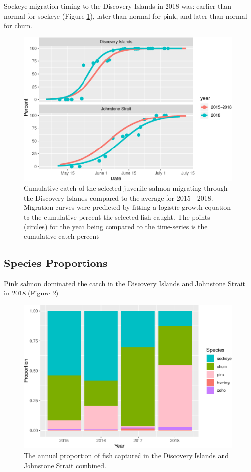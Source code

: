 \documentclass[fleqn,10pt]{wlpeerj} %
\begin{document}
Sockeye migration timing to the Discovery Islands in 2018 was: earlier
than normal for sockeye (Figure \ref{fig:mt}), later than normal for
pink, and later than normal for chum.

\begin{figure}
\includegraphics[width=0.8\linewidth]{peer_j_migration_dynamics_files/figure-latex/mt-1} \caption{Cumulative catch of the selected juvenile salmon migrating through the Discovery Islands compared to the average for 2015—2018. Migration curves were predicted by fitting a logistic growth equation to the cumulative percent the selected fish caught. The points (circles) for the year being compared to the time-series is the cumulative catch percent}\label{fig:mt}
\end{figure}

\subsection*{Species Proportions}\label{species-proportions}

Pink salmon dominated the catch in the Discovery Islands and Johnstone
Strait in 2018 (Figure \ref{fig:prop}).

\begin{figure}
\includegraphics[width=0.8\linewidth]{peer_j_migration_dynamics_files/figure-latex/prop-1} \caption{The annual proportion of fish captured in the Discovery Islands and Johnstone Strait combined.}\label{fig:prop}
\end{figure}
\end{document}
